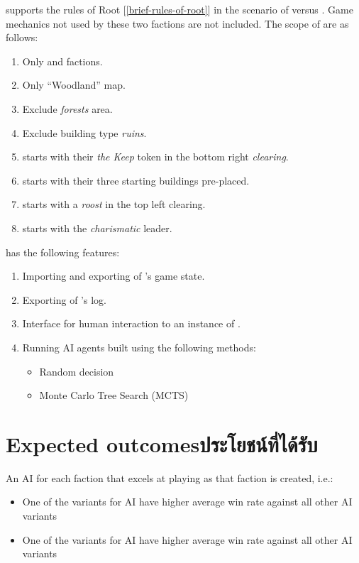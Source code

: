 \RootOurs{} supports the rules of Root [\ref{brief-rules-of-root}] in the scenario of \Marquise{} versus \Eyrie{}. Game mechanics not used by these two factions are not included. The scope of \RootOurs{} are as follows:
\begin{enumerate}
    \item Only \Marquise{} and \Eyrie{} factions.
    \item Only ``Woodland'' map.
    \item Exclude \textit{forests} area.
    \item Exclude building type \textit{ruins}.
    \item \Marquise{} starts with their \textit{the Keep} token in the bottom right \textit{clearing}.
    \item \Marquise{} starts with their three starting buildings pre-placed.
    \item \Eyrie{} starts with a \textit{roost} in the top left clearing.
    \item \Eyrie{} starts with the \textit{charismatic} leader.
\end{enumerate}

\RootAI{} has the following features:
\begin{enumerate}
    \item Importing and exporting of \RootOurs{}'s game state.
    \item Exporting of \RootOurs{}'s log.
    \item Interface for human interaction to an instance of \RootOurs{}.
    \item Running AI agents built using the following methods:
    \begin{itemize}
        \item Random decision
        \item Monte Carlo Tree Search (MCTS)
    \end{itemize}
\end{enumerate}



\section{\ifenglish Expected outcomes\else ประโยชน์ที่ได้รับ\fi}
An AI for each faction that excels at playing as that faction is created, i.e.:
\begin{itemize}
    \item One of the variants for \Marquise{} AI have higher average win rate   against all other \Eyrie{} AI variants
    \item One of the variants for \Eyrie{} AI have higher average win rate against all other \Marquise{} AI variants
\end{itemize}

